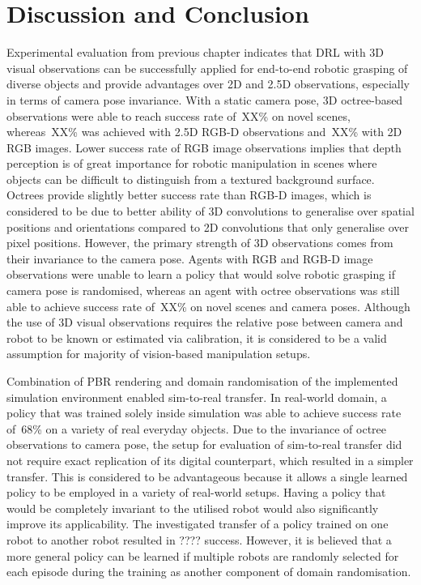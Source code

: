 \chapter{Discussion and Conclusion}\label{ch:discussion_and_conclusion}

Experimental evaluation from previous chapter indicates that DRL with 3D visual observations can be successfully applied for end-to-end robotic grasping of diverse objects and provide advantages over 2D and 2.5D observations, especially in terms of camera pose invariance. With a static camera pose, 3D octree-based observations were able to reach success rate of~XX\% on novel scenes, whereas~XX\% was achieved with 2.5D RGB-D observations and~XX\% with 2D RGB images. Lower success rate of RGB image observations implies that depth perception is of great importance for robotic manipulation in scenes where objects can be difficult to distinguish from a textured background surface. Octrees provide slightly better success rate than RGB-D images, which is considered to be due to better ability of 3D convolutions to generalise over spatial positions and orientations compared to 2D convolutions that only generalise over pixel positions. However, the primary strength of 3D observations comes from their invariance to the camera pose. Agents with RGB and RGB-D image observations were unable to learn a policy that would solve robotic grasping if camera pose is randomised, whereas an agent with octree observations was still able to achieve success rate of~XX\% on novel scenes and camera poses. Although the use of 3D visual observations requires the relative pose between camera and robot to be known or estimated via calibration, it is considered to be a valid assumption for majority of vision-based manipulation setups.


Combination of PBR rendering and domain randomisation of the implemented simulation environment enabled sim-to-real transfer. In real-world domain, a policy that was trained solely inside simulation was able to achieve success rate of~68\% on a variety of real everyday objects. Due to the invariance of octree observations to camera pose, the setup for evaluation of sim-to-real transfer did not require exact replication of its digital counterpart, which resulted in a simpler transfer. This is considered to be advantageous because it allows a single learned policy to be employed in a variety of real-world setups. Having a policy that would be completely invariant to the utilised robot would also significantly improve its applicability. The investigated transfer of a policy trained on one robot to another robot resulted in ???? success. However, it is believed that a more general policy can be learned if multiple robots are randomly selected for each episode during the training as another component of domain randomisation.

